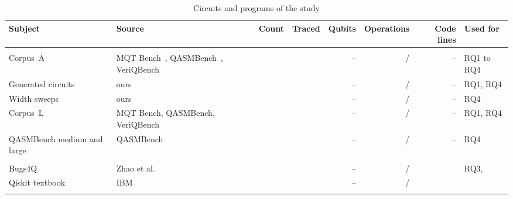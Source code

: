 \begin{table}[t]
  \centering
  \caption{Circuits and programs of the study}
  \label{tab:subjects}
  \footnotesize\setlength{\tabcolsep}{4pt}\renewcommand{\arraystretch}{1.15}
  \newcommand{\sep}{\arrayrulecolor{black!25}\hline\arrayrulecolor{black}}
  \newcommand{\blk}[1]{\multicolumn{8}{@{}l}{\textit{#1}}\\}
  \begin{tabularx}{\textwidth}{@{}>{\raggedright\arraybackslash}X >{\raggedright\arraybackslash}p{3.05cm}
                  r r r r r >{\raggedright\arraybackslash}p{2.2cm}@{}}
    \toprule
    \textbf{Subject} & \textbf{Source} & \textbf{Count} & \textbf{Traced} & \textbf{Qubits} & \textbf{Operations} &
      \textbf{Code lines} & \textbf{Used for} \\
    \midrule
    \blk{Circuits}
    Corpus~A & MQT Bench~\cite{quetschlich2023mqt}, QASMBench~\cite{li2023qasmbench}, VeriQBench~\cite{chen2022veriqbench} &
      \numSubjACount{} & \numSubjATraced{} & \numSubjAMinQubits{}--\numSubjAMaxQubits{} & \numSubjAMedianOps{} / \numSubjAMaxOps{} & -- & RQ1 to RQ4 \\ \sep
    Generated circuits & ours & \numSubjGenCount{} & \numSubjGenTraced{} & \numSubjGenMinQubits{}--\numSubjGenMaxQubits{} &
      \numSubjGenMedianOps{} / \numSubjGenMaxOps{} & -- & RQ1, RQ4 \\ \sep
    Width sweeps & ours & \numSubjSweepCount{} & \numSubjSweepTraced{} & \numSubjSweepMinQubits{}--\numSubjSweepMaxQubits{} &
      \numSubjSweepMedianOps{} / \numSubjSweepMaxOps{} & -- & RQ4 \\ \sep
    Corpus~L & MQT Bench, QASMBench, VeriQBench & \numSubjLCount{} & \numSubjLTraced{} & \numSubjLMinQubits{}--\numSubjLMaxQubits{} &
      \numSubjLMedianOps{} / \numSubjLMaxOps{} & -- & RQ1, RQ4 \\ \sep
    QASMBench medium and large & QASMBench~\cite{li2023qasmbench} & \numSubjQbCount{} & \numSubjQbTraced{} &
      \numSubjQbMinQubits{}--\numSubjQbMaxQubits{} & \numSubjQbMedianOps{} / \numSubjQbMaxOps{} & -- & RQ4 \\
    \midrule
    \blk{Programs}
    Bugs4Q & Zhao et al.~\cite{zhao2023bugs4q} & \numSubjBugsCount{} & \numSubjBugsTraced{} &
      \numSubjBugsMinQubits{}--\numSubjBugsMaxQubits{} & \numSubjBugsMedianOps{} / \numSubjBugsMaxOps{} & \numSubjBugsMedianLines{} & RQ3, \tool{} \\ \sep
    Qiskit textbook & IBM~\cite{qiskittextbook} & \numSubjTextCount{} & \numSubjTextTraced{} &
      \numSubjTextMinQubits{}--\numSubjTextMaxQubits{} & \numSubjTextMedianOps{} / \numSubjTextMaxOps{} & \numSubjTextMedianLines{} & \tool{} \\ \sep

\end{tabularx}
\end{table}
